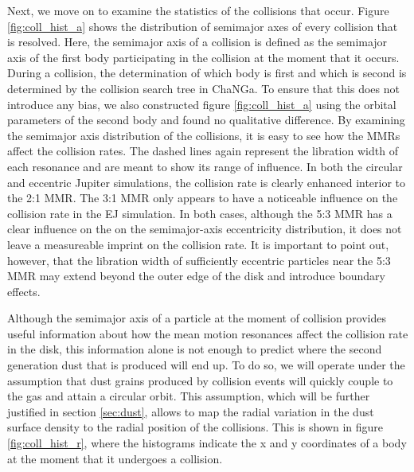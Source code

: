 \documentclass[twocolumn]{aastex63}
\begin{document}
Next, we move on to examine the statistics of the collisions that occur. Figure \ref{fig:coll_hist_a} shows the distribution of semimajor 
axes of every collision that is resolved. Here, the semimajor axis of a collision is defined as the semimajor axis of the first body 
participating in the collision at the moment that it occurs. During a collision, the determination of which body is first and which is 
second is determined by the collision search tree in {\sc ChaNGa}. To ensure that this does not introduce any bias, we also 
constructed figure \ref{fig:coll_hist_a} using the orbital parameters of the second body and found no qualitative difference. By 
examining the semimajor axis distribution of the collisions, it is easy to see how the MMRs affect the collision rates. The dashed lines 
again represent the libration width of each resonance and are meant to show its range of influence. In both the circular and eccentric 
Jupiter simulations, the collision rate is clearly enhanced interior to the 2:1 MMR. The 3:1 MMR only appears to have a noticeable 
influence on the collision rate in the EJ simulation. In both cases, although the 5:3 MMR has a clear influence on the on the 
semimajor-axis eccentricity distribution, it does not leave a measureable imprint on the collision rate. It is important to point out, 
however, that the libration width of sufficiently eccentric particles near the 5:3 MMR may extend beyond the outer edge of the disk 
and introduce boundary effects.

Although the semimajor axis of a particle at the moment of collision provides useful information about how the mean motion 
resonances affect the collision rate in the disk, this information alone is not enough to predict where the second generation dust that 
is produced will end up. To do so, we will operate under the assumption that dust grains produced by collision events will quickly 
couple to the gas and attain a circular orbit. This assumption, which will be further justified in section \ref{sec:dust}, allows to map the 
radial variation in the dust surface density to the radial position of the collisions. This is shown in figure \ref{fig:coll_hist_r}, where the 
histograms indicate the x and y coordinates of a body at the moment that it undergoes a collision.
\end{document}
